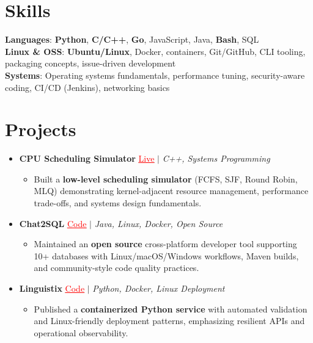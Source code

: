 \documentclass[letterpaper,10pt]{article}
\newcommand{\resumeItem}[1]{\item\small{{#1 \vspace{-2pt}}}}
\newcommand{\resumeProjectHeading}[1]{\item \small #1 \vspace{-2pt}}
\newcommand{\resumeSubHeadingListStart}{\begin{itemize}[leftmargin=0.0in, label={}]}
\newcommand{\resumeSubHeadingListEnd}{\end{itemize}}
\newcommand{\resumeProjItemListStart}{\begin{itemize}[leftmargin=0.15in,label=\textbullet,itemsep=0pt,topsep=0pt,parsep=0pt,partopsep=0pt]}
\newcommand{\resumeProjItemListEnd}{\end{itemize}\vspace{-4pt}}
\begin{document}
\section{Skills}
\begin{itemize}[leftmargin=0.15in, label={}]
\small{\item{
\textbf{Languages}: \textbf{Python}, \textbf{C/C++}, \textbf{Go}, JavaScript, Java, \textbf{Bash}, SQL \\
\textbf{Linux \& OSS}: \textbf{Ubuntu/Linux}, Docker, containers, Git/GitHub, CLI tooling, packaging concepts, issue-driven development \\
\textbf{Systems}: Operating systems fundamentals, performance tuning, security-aware coding, CI/CD (Jenkins), networking basics
}}
\end{itemize}
\vspace{-16pt}
\section{Projects}
\resumeSubHeadingListStart
\vspace{-2pt}
\resumeProjectHeading{\textbf{CPU Scheduling Simulator} {\href{https://cpu-scheduler-amber.vercel.app/}{\textcolor{red}{\underline{Live}}}} $|$ \emph{C++, Systems Programming}}
\resumeProjItemListStart
\resumeItem{Built a \textbf{low-level scheduling simulator} (FCFS, SJF, Round Robin, MLQ) demonstrating kernel-adjacent resource management, performance trade-offs, and systems design fundamentals.}
\resumeProjItemListEnd
\vspace{3pt}
\resumeProjectHeading{\textbf{Chat2SQL} {\href{https://github.com/SAHAJ-BHADJA/Chat2SQL}{\textcolor{red}{\underline{Code}}}} $|$ \emph{Java, Linux, Docker, Open Source}}
\resumeProjItemListStart
\resumeItem{Maintained an \textbf{open source} cross-platform developer tool supporting 10+ databases with Linux/macOS/Windows workflows, Maven builds, and community-style code quality practices.}
\resumeProjItemListEnd
\vspace{3pt}
\resumeProjectHeading{\textbf{Linguistix} {\href{https://github.com/SAHAJ-BHADJA/Linguistix}{\textcolor{red}{\underline{Code}}}} $|$ \emph{Python, Docker, Linux Deployment}}
\resumeProjItemListStart
\resumeItem{Published a \textbf{containerized Python service} with automated validation and Linux-friendly deployment patterns, emphasizing resilient APIs and operational observability.}
\resumeProjItemListEnd
\resumeSubHeadingListEnd
\end{document}
